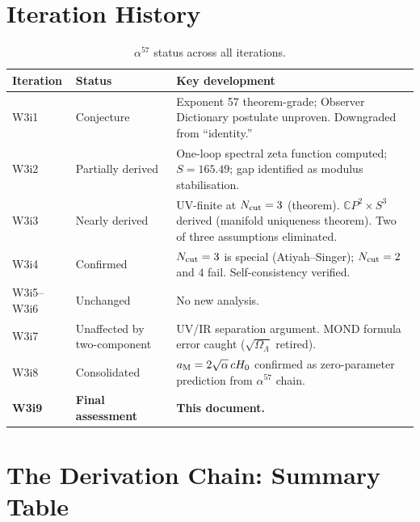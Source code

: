 \documentclass[11pt,a4paper]{article}
\newcommand{\CP}{\mathbb{C}P}
\newcommand{\Hzero}{H_0}
\newcommand{\aM}{a_{\rm M}}
\begin{document}
\section{Iteration History}
\label{sec:history}

\begin{table}[h]
\centering
\small
\caption{$\alpha^{57}$ status across all iterations.}
\begin{tabular}{llp{7cm}}
\toprule
\textbf{Iteration} & \textbf{Status} & \textbf{Key development} \\
\midrule
W3i1 & Conjecture & Exponent 57 theorem-grade; Observer Dictionary
  postulate unproven. Downgraded from ``identity.'' \\
W3i2 & Partially derived & One-loop spectral zeta function computed;
  $S = 165.49$; gap identified as modulus stabilisation. \\
W3i3 & Nearly derived & UV-finite at $N_{\rm cut} = 3$ (theorem).
  $\CP^2 \times S^3$ derived (manifold uniqueness theorem).
  Two of three assumptions eliminated. \\
W3i4 & Confirmed & $N_{\rm cut} = 3$ is special (Atiyah--Singer);
  $N_{\rm cut} = 2$ and $4$ fail. Self-consistency verified. \\
W3i5--W3i6 & Unchanged & No new analysis. \\
W3i7 & Unaffected by two-component & UV/IR separation argument.
  MOND formula error caught ($\sqrt{\Omega_\Lambda}$ retired). \\
W3i8 & Consolidated & $\aM = 2\sqrt{\alpha}\,c\Hzero$ confirmed as
  zero-parameter prediction from $\alpha^{57}$ chain. \\
\textbf{W3i9} & \textbf{Final assessment} & \textbf{This document.} \\
\bottomrule
\end{tabular}
\end{table}

\section{The Derivation Chain: Summary Table}
\label{sec:chain-table}
\end{document}
